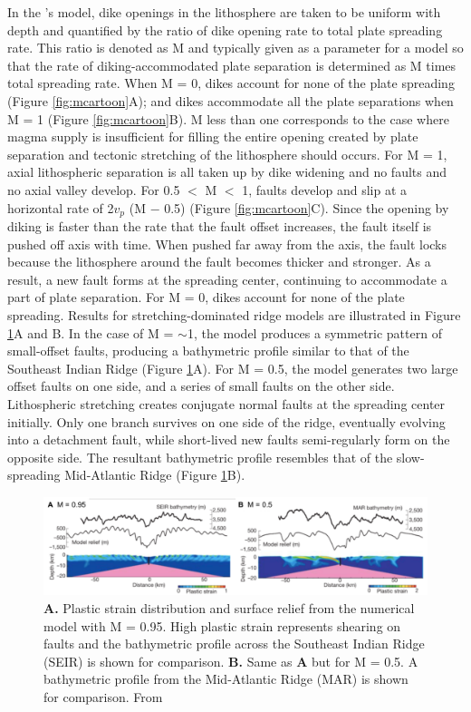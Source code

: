 \documentclass[letterpaper,12pt,notitle]{memphisthesis}                     %
\begin{document}
In the \citet{Buck2005}'s model, dike openings in the lithosphere are taken to be uniform with depth and quantified by the ratio of dike opening rate to total plate spreading rate. This ratio is denoted as M and typically given as a parameter for a model so that the rate of diking-accommodated plate separation is determined as M times total spreading rate. When M = 0, dikes account for none of the plate spreading (Figure \ref{fig:mcartoon}A); and dikes accommodate all the plate separations when M = 1 (Figure \ref{fig:mcartoon}B). M less than one corresponds to the case where magma supply is insufficient for filling the entire opening created by plate separation and tectonic stretching of the lithosphere should occurs. For M = 1, axial lithospheric separation is all taken up by dike widening and no faults and no axial valley develop.  For 0.5 $<$ M $<$ 1, faults develop and slip at a horizontal rate of 2$v_p$ (M $-$ 0.5) (Figure \ref{fig:mcartoon}C). Since the opening by diking is faster than the rate that the fault offset increases, the fault itself is pushed off axis with time. When pushed far away from the axis, the fault locks because the lithosphere around the fault becomes thicker and stronger. As a result, a new fault forms at the spreading center, continuing to accommodate a part of plate separation. For M = 0, dikes account for none of the plate spreading. Results for stretching-dominated ridge models are illustrated in Figure \ref{fig:mfactor}A and B. In the case of M = $\sim$1, the model produces a symmetric pattern of small-offset faults, producing a bathymetric profile similar to that of the Southeast Indian Ridge (Figure \ref{fig:mfactor}A). For M = 0.5, the model generates two large offset faults on one side, and a series of small faults on the other side. Lithospheric stretching creates conjugate normal faults at the spreading center initially. Only one branch survives on one side of the ridge, eventually evolving into a detachment fault, while short-lived new faults semi-regularly form on the opposite side. The resultant bathymetric profile resembles that of the slow-spreading Mid-Atlantic Ridge (Figure \ref{fig:mfactor}B).
%
\begin{figure}[!htb]
	\centering
	\includegraphics[width=0.99\linewidth]{./figs/fig1.pdf}
	\caption{\textbf{A.} Plastic strain distribution and surface relief from the numerical model with M = 0.95. High plastic strain represents shearing on faults and the bathymetric profile across the Southeast Indian Ridge (SEIR) is shown for comparison. \textbf{B.} Same as \textbf{A} but for M = 0.5. A bathymetric profile from the Mid-Atlantic Ridge (MAR) is shown for comparison. From \citet{Buck2005}}
	\label{fig:mfactor}
\end{figure}
\end{document}
